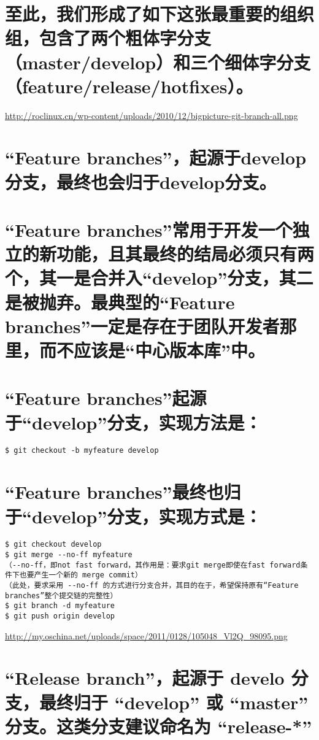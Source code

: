 \documentclass[11pt]{article}
\begin{document}
\section{至此，我们形成了如下这张最重要的组织组，包含了两个粗体字分支（master/develop）和三个细体字分支（feature/release/hotfixes）。}
\label{sec-8}

\href{http://roclinux.cn/wp-content/uploads/2010/12/bigpicture-git-branch-all.png}{http://roclinux.cn/wp-content/uploads/2010/12/bigpicture-git-branch-all.png}
\section{“Feature branches”，起源于develop分支，最终也会归于develop分支。}
\label{sec-9}
\section{“Feature branches”常用于开发一个独立的新功能，且其最终的结局必须只有两个，其一是合并入“develop”分支，其二是被抛弃。最典型的“Feature branches”一定是存在于团队开发者那里，而不应该是“中心版本库”中。}
\label{sec-10}
\section{“Feature branches”起源于“develop”分支，实现方法是：}
\label{sec-11}


\begin{verbatim}
$ git checkout -b myfeature develop
\end{verbatim}
\section{“Feature branches”最终也归于“develop”分支，实现方式是：}
\label{sec-12}


\begin{verbatim}
$ git checkout develop
$ git merge --no-ff myfeature
（--no-ff，即not fast forward，其作用是：要求git merge即使在fast forward条件下也要产生一个新的 merge commit）
（此处，要求采用 --no-ff 的方式进行分支合并，其目的在于，希望保持原有“Feature branches”整个提交链的完整性）
$ git branch -d myfeature
$ git push origin develop
\end{verbatim}
\href{http://my.oschina.net/uploads/space/2011/0128/105048_Vl2Q_98095.png}{http://my.oschina.net/uploads/space/2011/0128/105048\_Vl2Q\_98095.png}
\section{“Release branch”，起源于 develo 分支，最终归于 “develop” 或 “master” 分支。这类分支建议命名为 “release-*”}
\label{sec-13}
\end{document}
